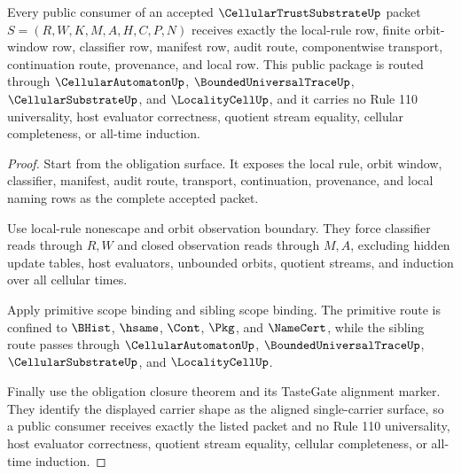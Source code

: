 \begin{theorem}
\label{thm:cellular-trust-substrate-public-export-package}
Every public consumer of an accepted $\CellularTrustSubstrateUp$ packet $S=(R,W,K,M,A,H,C,P,N)$ receives exactly the local-rule row, finite orbit-window row, classifier row, manifest row, audit route, componentwise transport, continuation route, provenance, and local \NameCert{} row. This public package is routed through $\CellularAutomatonUp$, $\BoundedUniversalTraceUp$, $\CellularSubstrateUp$, and $\LocalityCellUp$, and it carries no Rule 110 universality, host evaluator correctness, quotient stream equality, cellular completeness, or all-time induction.
\end{theorem}
\begin{proof}
Start from the obligation surface. It exposes the local rule, orbit window, classifier, manifest, audit route, transport, continuation, provenance, and local naming rows as the complete accepted packet.

Use local-rule nonescape and orbit observation boundary. They force classifier reads through $R,W$ and closed observation reads through $M,A$, excluding hidden update tables, host evaluators, unbounded orbits, quotient streams, and induction over all cellular times.

Apply primitive scope binding and sibling scope binding. The primitive route is confined to $\BHist$, $\hsame$, $\Cont$, $\Pkg$, and $\NameCert$, while the sibling route passes through $\CellularAutomatonUp$, $\BoundedUniversalTraceUp$, $\CellularSubstrateUp$, and $\LocalityCellUp$.

Finally use the obligation closure theorem and its TasteGate alignment marker. They identify the displayed carrier shape as the aligned single-carrier surface, so a public consumer receives exactly the listed packet and no Rule 110 universality, host evaluator correctness, quotient stream equality, cellular completeness, or all-time induction.
\end{proof}


